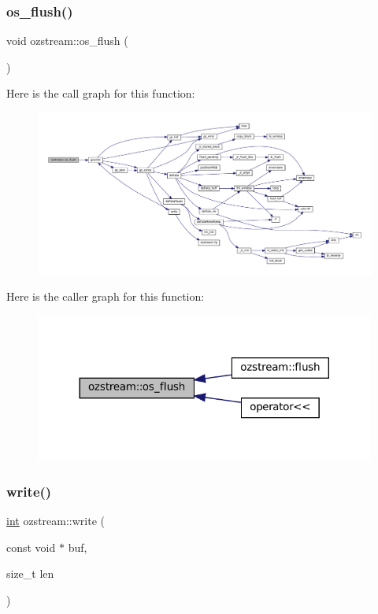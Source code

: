 \subsubsection{\texorpdfstring{os\+\_\+flush()}{os\_flush()}}
{\footnotesize\ttfamily void ozstream\+::os\+\_\+flush (\begin{DoxyParamCaption}{ }\end{DoxyParamCaption})\hspace{0.3cm}{\ttfamily [inline]}}

Here is the call graph for this function\+:
\nopagebreak
\begin{figure}[H]
\begin{center}
\leavevmode
\includegraphics[width=350pt]{classozstream_aa65b61b59ad9d43f3f35095cb353f57f_cgraph}
\end{center}
\end{figure}
Here is the caller graph for this function\+:
\nopagebreak
\begin{figure}[H]
\begin{center}
\leavevmode
\includegraphics[width=317pt]{classozstream_aa65b61b59ad9d43f3f35095cb353f57f_icgraph}
\end{center}
\end{figure}
\mbox{\label{classozstream_a2dbcc101aa6e94eb2ca866e9b8db4c84}} 
\subsubsection{\texorpdfstring{write()}{write()}}
{\footnotesize\ttfamily \mbox{\hyperlink{ioapi_8h_a787fa3cf048117ba7123753c1e74fcd6}{int}} ozstream\+::write (\begin{DoxyParamCaption}\item[{const void $\ast$}]{buf,  }\item[{size\+\_\+t}]{len }\end{DoxyParamCaption})\hspace{0.3cm}{\ttfamily [inline]}}

